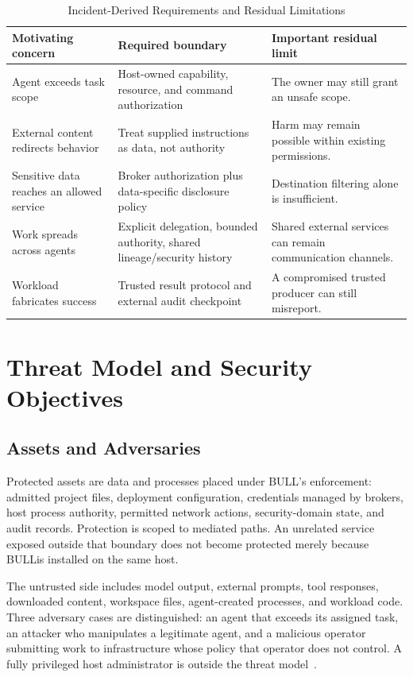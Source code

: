 \documentclass[journal]{IEEEtran}
\newcommand{\bull}{\textsc{BULL}}
\begin{document}
\begin{table}[!t]
\caption{Incident-Derived Requirements and Residual Limitations}
\label{tab:requirements}
\centering
\small
\begin{tabularx}{\textwidth}{lYY}
\toprule
\textbf{Motivating concern} & \textbf{Required boundary} & \textbf{Important residual limit} \\
\midrule
Agent exceeds task scope & Host-owned capability, resource, and command authorization & The owner may still grant an unsafe scope. \\
External content redirects behavior & Treat supplied instructions as data, not authority & Harm may remain possible within existing permissions. \\
Sensitive data reaches an allowed service & Broker authorization plus data-specific disclosure policy & Destination filtering alone is insufficient. \\
Work spreads across agents & Explicit delegation, bounded authority, shared lineage/security history & Shared external services can remain communication channels. \\
Workload fabricates success & Trusted result protocol and external audit checkpoint & A compromised trusted producer can still misreport. \\
\bottomrule
\end{tabularx}
\end{table}

\section{Threat Model and Security Objectives}
\subsection{Assets and Adversaries}
Protected assets are data and processes placed under \bull's enforcement: admitted project files, deployment configuration, credentials managed by brokers, host process authority, permitted network actions, security-domain state, and audit records. Protection is scoped to mediated paths. An unrelated service exposed outside that boundary does not become protected merely because \bull is installed on the same host.

The untrusted side includes model output, external prompts, tool responses, downloaded content, workspace files, agent-created processes, and workload code. Three adversary cases are distinguished: an agent that exceeds its assigned task, an attacker who manipulates a legitimate agent, and a malicious operator submitting work to infrastructure whose policy that operator does not control. A fully privileged host administrator is outside the threat model~\cite{BULL_ProdSec}.
\end{document}

